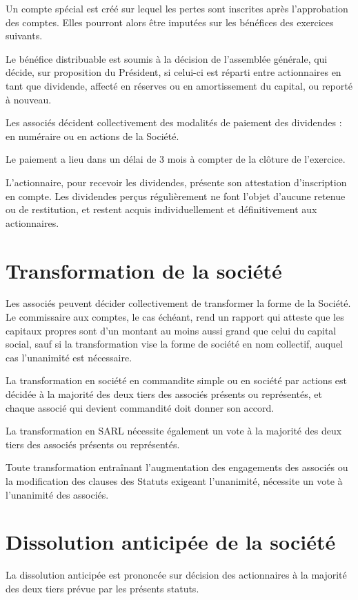 \documentclass[a4paper,12pt]{report}
\begin{document}
Un compte spécial est créé sur lequel les pertes sont inscrites après l'approbation des comptes. Elles pourront alors être imputées sur les bénéfices des exercices suivants.

Le bénéfice distribuable est soumis à la décision de l'assemblée générale, qui décide, sur proposition du Président, si celui-ci est réparti entre actionnaires en tant que dividende, affecté en réserves ou en amortissement du capital, ou reporté à nouveau.

Les associés décident collectivement des modalités de paiement des dividendes : en numéraire ou en actions de la Société.

Le paiement a lieu dans un délai de 3 mois à compter de la clôture de l'exercice.

L'actionnaire, pour recevoir les dividendes, présente son attestation d'inscription en compte. Les dividendes perçus régulièrement ne font l'objet d'aucune retenue ou de restitution, et restent acquis individuellement et définitivement aux actionnaires.

\section{Transformation de la société}
Les associés peuvent décider collectivement de transformer la forme de la Société. Le commissaire aux comptes, le cas échéant, rend un rapport qui atteste que les capitaux propres sont d'un montant au moins aussi grand que celui du capital social, sauf si la transformation vise la forme de société en nom collectif, auquel cas l'unanimité est nécessaire.

La transformation en société en commandite simple ou en société par actions est décidée à la majorité des deux tiers des associés présents ou représentés, et chaque associé qui devient commandité doit donner son accord.

La transformation en SARL nécessite également un vote à la majorité des deux tiers des associés présents ou représentés.

Toute transformation entraînant l'augmentation des engagements des associés ou la modification des clauses des Statuts exigeant l'unanimité, nécessite un vote à l'unanimité des associés.

\section{Dissolution anticipée de la société}
La dissolution anticipée est prononcée sur décision des actionnaires à la majorité des deux tiers prévue par les présents statuts.
\end{document}
